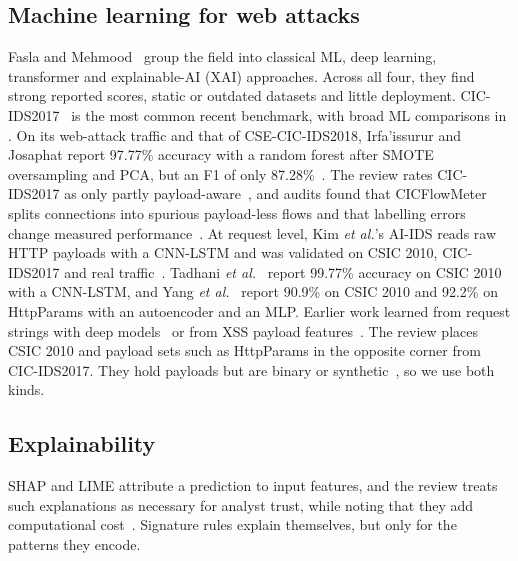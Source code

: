 \documentclass[conference]{IEEEtran}
\begin{document}
\subsection{Machine learning for web attacks}
Fasla and Mehmood~\cite{fasla2026} group the field into classical ML, deep learning,
transformer and explainable-AI (XAI) approaches. Across all four, they find strong
reported scores, static or outdated datasets and little deployment.
CIC-IDS2017~\cite{sharafaldin2018} is the most common recent benchmark, with broad ML comparisons in
\cite{maseer2021,kurniabudi2020}. On its web-attack traffic and that of CSE-CIC-IDS2018, Irfa'issurur
and Josaphat report 97.77\% accuracy with a random forest after SMOTE oversampling and PCA, but an
F1 of only 87.28\%~\cite{irfaissurur2025}. The review
rates CIC-IDS2017 as only partly payload-aware~\cite{fasla2026}, and audits found that CICFlowMeter
splits connections into spurious payload-less flows and that labelling errors change measured
performance~\cite{engelen2021,lanvin2023}.
At request level, Kim \emph{et al.}'s AI-IDS reads raw HTTP payloads with a CNN-LSTM and was
validated on CSIC 2010, CIC-IDS2017 and real traffic~\cite{kim2020}. Tadhani \emph{et al.}~\cite{tadhani2024}
report 99.77\% accuracy on CSIC 2010 with a CNN-LSTM, and Yang \emph{et al.}~\cite{yang2025} report
90.9\% on CSIC 2010 and 92.2\% on HttpParams with an autoencoder and an MLP. Earlier work learned
from request strings with deep models~\cite{liang2017} or from XSS payload features~\cite{mereani2018}.
The review places CSIC 2010 and payload sets such as HttpParams in the opposite corner from
CIC-IDS2017. They hold payloads but are binary or synthetic~\cite{fasla2026}, so we use both kinds.

\subsection{Explainability}
SHAP and LIME attribute a prediction to input features, and the review treats such explanations
as necessary for analyst trust, while noting that they add computational cost~\cite{fasla2026}.
Signature rules explain themselves, but only for the patterns they encode.
\end{document}
